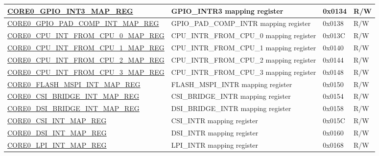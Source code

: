 \begin{longtable}{ | p{7.5cm} | p{7.2cm} | p{1.3cm} | p{1cm} | }
\hyperref[regdesc:CORE0GPIOINT3MAPREG]{CORE0\_GPIO\_INT3\_MAP\_REG} & GPIO\_INTR3 mapping register & 0x0134 & R/W \\ \hline

\hyperref[regdesc:CORE0GPIOPADCOMPINTMAPREG]{CORE0\_GPIO\_PAD\_COMP\_INT\_MAP\_REG} & GPIO\_PAD\_COMP\_INTR mapping register & 0x0138 & R/W \\ \hline

\hyperref[regdesc:CORE0CPUINTFROMCPU0MAPREG]{CORE0\_CPU\_INT\_FROM\_CPU\_0\_MAP\_REG} & CPU\_INTR\_FROM\_CPU\_0 mapping register & 0x013C & R/W \\ \hline

\hyperref[regdesc:CORE0CPUINTFROMCPU1MAPREG]{CORE0\_CPU\_INT\_FROM\_CPU\_1\_MAP\_REG} & CPU\_INTR\_FROM\_CPU\_1 mapping register & 0x0140 & R/W \\ \hline

\hyperref[regdesc:CORE0CPUINTFROMCPU2MAPREG]{CORE0\_CPU\_INT\_FROM\_CPU\_2\_MAP\_REG} & CPU\_INTR\_FROM\_CPU\_2 mapping register & 0x0144 & R/W \\ \hline

\hyperref[regdesc:CORE0CPUINTFROMCPU3MAPREG]{CORE0\_CPU\_INT\_FROM\_CPU\_3\_MAP\_REG} & CPU\_INTR\_FROM\_CPU\_3 mapping register & 0x0148 & R/W \\ \hline

\hyperref[regdesc:CORE0FLASHMSPIINTMAPREG]{CORE0\_FLASH\_MSPI\_INT\_MAP\_REG} & FLASH\_MSPI\_INTR mapping register & 0x0150 & R/W \\ \hline

\hyperref[regdesc:CORE0CSIBRIDGEINTMAPREG]{CORE0\_CSI\_BRIDGE\_INT\_MAP\_REG} & CSI\_BRIDGE\_INTR mapping register & 0x0154 & R/W \\ \hline

\hyperref[regdesc:CORE0DSIBRIDGEINTMAPREG]{CORE0\_DSI\_BRIDGE\_INT\_MAP\_REG} & DSI\_BRIDGE\_INTR mapping register & 0x0158 & R/W \\ \hline

\hyperref[regdesc:CORE0CSIINTMAPREG]{CORE0\_CSI\_INT\_MAP\_REG} & CSI\_INTR mapping register & 0x015C & R/W \\ \hline

\hyperref[regdesc:CORE0DSIINTMAPREG]{CORE0\_DSI\_INT\_MAP\_REG} & DSI\_INTR mapping register & 0x0160 & R/W \\ \hline


\hyperref[regdesc:CORE0LPIINTMAPREG]{CORE0\_LPI\_INT\_MAP\_REG} & LPI\_INTR mapping register & 0x0168 & R/W \\ \hline


\end{longtable}
